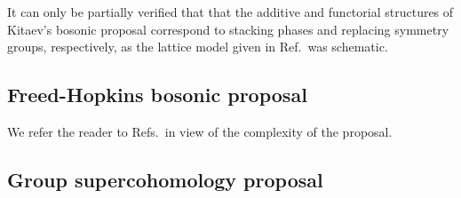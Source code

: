\documentclass[sort&compress]{elsarticle}
\theoremstyle{theoremstyle}
\theoremstyle{framedtheoremstyle}
\theoremstyle{definitionstyle}
\theoremstyle{definitionstyle}
\theoremstyle{definitionstyle}
\theoremstyle{definitionstyle}
\theoremstyle{nameddefinitionstyle}
\theoremstyle{framednameddefinitionstyle}
\theoremstyle{proofstyle}
\theoremstyle{definitionstyle}
\begin{document}
\begin{appendices}
It can only be partially verified that that the additive and functorial structures of Kitaev's bosonic proposal correspond to stacking phases and replacing symmetry groups, respectively, as the lattice model given in Ref.\,\cite{Kitaev_KITP} was schematic.





\subsection{Freed-Hopkins bosonic proposal \label{subapp:Freed_bosonic_proposal}}

We refer the reader to Refs.\,\cite{Freed_SRE_iTQFT, Freed_ReflectionPositivity} in view of the complexity of the proposal.





\subsection{Group supercohomology proposal \label{subapp:group_supercohomology_proposal}}


\end{appendices}
\end{document}

